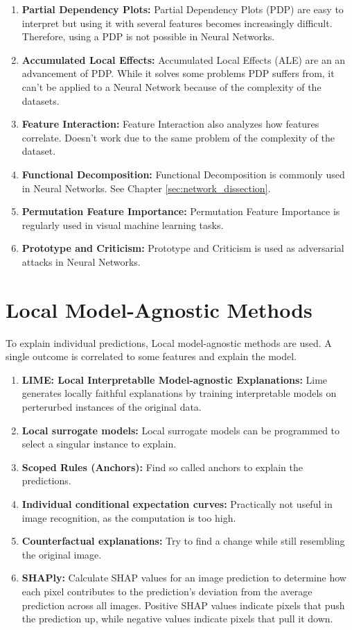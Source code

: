 \begin{enumerate}
	\item \textbf{Partial Dependency Plots:} Partial Dependency Plots (PDP) are easy to interpret but using it with several features becomes increasingly difficult. Therefore, using a PDP is not possible in Neural Networks.
	\item \textbf{Accumulated Local Effects:} Accumulated Local Effects (ALE) are an an advancement of PDP. While it solves some problems PDP suffers from, it can't be applied to a Neural Network because of the complexity of the datasets.
	\item \textbf{Feature Interaction:} Feature Interaction also analyzes how features correlate. Doesn't work due to the same problem of the complexity of the dataset.
	\item \textbf{Functional Decomposition:} Functional Decomposition is commonly used in Neural Networks. See Chapter \ref{sec:network_dissection}.
	\item \textbf{Permutation Feature Importance:} Permutation Feature Importance is regularly used in visual machine learning tasks.
	\item \textbf{Prototype and Criticism:} Prototype and Criticism is used as adversarial attacks in Neural Networks.
	
\end{enumerate}


\section{Local Model-Agnostic Methods}

To explain individual predictions, Local model-agnostic methods are used. A single outcome is correlated to some features and explain the model.


\begin{enumerate}
	\item \textbf{LIME: Local Interpretablle Model-agnostic Explanations:} Lime generates locally faithful explanations by training interpretable models on perterurbed instances of the original data.
	\item \textbf{Local surrogate models:} Local surrogate models can be programmed to select a singular instance to explain.
	\item \textbf{Scoped Rules (Anchors):} Find so called anchors to explain the predictions.
	\item \textbf{Individual conditional expectation curves:} Practically not useful in image recognition, as the computation is too high.
	\item \textbf{Counterfactual explanations:} Try to find a change while still resembling the original image.
	\item \textbf{SHAPly:} Calculate SHAP values for an image prediction to determine how each pixel contributes to the prediction's deviation from the average prediction across all images.
	Positive SHAP values indicate pixels that push the prediction up, while negative values indicate pixels that pull it down.
\end{enumerate}




